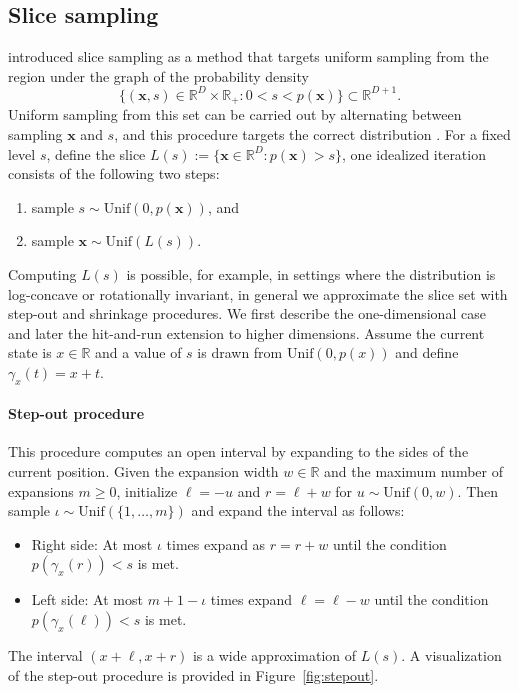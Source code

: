 \subsection{Slice sampling} \label{sec:slice_sampling}
\citet{Neal2003} introduced slice sampling as a method that targets uniform sampling from the region under the graph of the probability density
\begin{equation}
    \{(\boldsymbol{x},s)\in \mathbb{R}^{D}\times\mathbb{R}_{+} : 0 < s < p(\boldsymbol{x})\} \subset \mathbb{R}^{D+1}.
\end{equation}
Uniform sampling from this set can be carried out by alternating between  sampling  $\boldsymbol{x}$ and $s$, and this procedure targets the correct distribution \citep{Neal2003}. For a fixed level $s$, define the slice $L(s) := \{ \boldsymbol{x}\in \mathbb{R}^D : p(\boldsymbol{x}) > s \}$, one idealized iteration consists of the following two steps:
\begin{enumerate}
    \item sample $s \sim \mathrm{Unif}(0, p(\boldsymbol{x}))$, and
    \item sample $\boldsymbol{x} \sim \mathrm{Unif}( L(s) )$.
\end{enumerate}
Computing $L(s)$ is possible, for example, in settings where the distribution is log-concave or rotationally invariant, in general we approximate the slice set with  step-out and shrinkage procedures. We first describe the one-dimensional case and later the hit-and-run extension to higher dimensions.  Assume the current state is $x\in\mathbb{R}$ and a value of $s$ is drawn from $\mathrm{Unif}(0, p({x}))$ and define $\gamma_x(t) = x + t$. 

\paragraph{Step-out procedure}
This procedure computes an open interval by expanding to the sides of the current position. 
Given the expansion width $w\in\mathbb{R}$ and the maximum number of expansions $m\geq0$, initialize $\ell = -u$ and $r = \ell + w$ for $u\sim \mathrm{Unif}(0,w)$. Then sample $\iota \sim \mathrm{Unif}(\{1, \dots, m\})$ and expand the interval as follows:
\begin{itemize}
    \item Right side: At most $\iota$ times expand as $r = r + w$ until the condition $p(\gamma_x(r )) < s$ is met.
    \item Left side: At most $m+1-\iota$ times expand $\ell = \ell - w$ until the condition $p(\gamma_x(\ell )) < s$ is met.
\end{itemize}
The interval $(x+\ell, x+r)$ is a wide approximation of $L(s)$. A visualization of the step-out procedure is provided in Figure~\ref{fig:stepout}.


